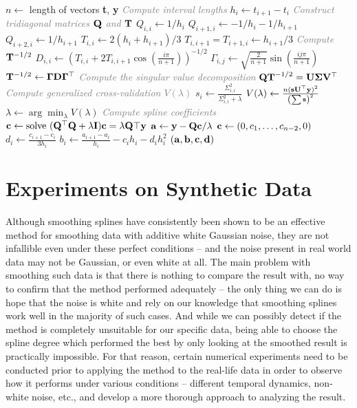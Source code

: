 \documentclass[11pt,leqno]{book}
\theoremstyle{definition}
\theoremstyle{plain}
\theoremstyle{definition}
\begin{document}
{\begin{algorithm}[H]
\begin{algorithmic}[1]
\State $n \gets$ length of vectors \textbf{t}, \textbf{y}
\State \textcolor{gray}{\textit{Compute interval lengths}}
    \State ${h}_i \gets {t}_{i+1} - {t}_{i}$
\EndFor
\State \textcolor{gray}{\textit{Construct tridiagonal matrices $\vb{Q}$ and $\vb{T}$}}
    \State ${Q}_{i,i}\gets{1}/{h_i}$
    \State ${Q}_{i+1,i}\gets-1/{h}_i-1/{h}_{i+1}$
    \State ${Q}_{i+2,i}\gets{1}/{{h}_{i+1}}$
    \State ${T}_{i,i}\gets{2({h}_i+{h}_{i+1})}/{3}$
    \State ${T}_{i,i+1}={T}_{i+1,i}\gets{{h}_{i+1}}/{3}$
\EndFor
\State \textcolor{gray}{\textit{Compute $\vb{T}^{-1/2}$}}
    \State ${D}_{i,i} \gets \left({T}_{i,i}+2{T}_{i,i+1}\cos(\frac{i\pi}{n+1})\right)^{-1/2}$
        \State ${{\Gamma}}_{i,j}\gets  \sqrt{\frac{2}{n+1}}\sin(\frac{ij\pi}{n+1})$
    \EndFor
\EndFor
\State $\vb{T}^{-1/2}\gets \vb{\Gamma}\vb{D}\vb{\Gamma}^\top$
\State \textcolor{gray}{\textit{Compute the singular value decomposition}}
\State $\vb{QT}^{-1/2}=\vb{U}\vb{\Sigma}\vb{V}^\top$
\State \textcolor{gray}{\textit{Compute generalized cross-validation $V(\lambda)$}}
    \State ${{s}_i} \gets \frac{{{\Sigma}^2_{i,i}}}{{{\Sigma}^2_{i,i}}+\lambda }$
\EndFor
\State $V(\lambda)\gets \frac{n(\vb{s}\vb{U}^\top \vb{y})^2}{\left(\sum\vb{s}\right)^2}$
\State $\lambda \gets \arg\min_{\lambda} V(\lambda)$
\State \textcolor{gray}{\textit{Compute spline coefficients}}
\State $\vb{c}\gets \text{solve } (\vb{Q}^\top\vb{Q}+\lambda\vb{I})\vb{c}=\lambda\vb{Q}\top\vb{y}$
\State $\vb{a}\gets\vb{y}-\vb{Qc}/\lambda$
\State $\vb{c}\gets(0,c_1,\dots,c_{n-2},0)$
\State ${d}_i\gets\frac{{c}_{i+1}-{c}_i}{3{h}_i}$
\State  ${b}_i \gets\frac{{a}_{i+1}-{a}_i}{{h}_i} -{c}_i {h}_i -{d}_i {h}_i^2$
\EndFor
\State \Return $(\vb{a},\vb{b},\vb{c},\vb{d})$
\EndProcedure
\end{algorithmic}
\end{algorithm}
\chapter{Experiments on Synthetic Data}
Although smoothing splines have consistently been shown to be an effective method for smoothing data with additive white Gaussian noise, they are not infallible even under these perfect conditions -- and the noise present in real world data may not be Gaussian, or even white at all. The main problem with smoothing such data is that there is nothing to compare the result with, no way to confirm that the method performed adequately -- the only thing we can do is hope that the noise is white and rely on our knowledge that smoothing splines work well in the majority of such cases. And while we can possibly detect if the method is completely unsuitable for our specific data, being able to choose the spline degree which performed the best by only looking at the smoothed result is practically impossible. For that reason, certain numerical experiments need to be conducted prior to applying the method to the real-life data in order to observe how it performs under various conditions -- different temporal dynamics, non-white noise, etc., and develop a more thorough approach to analyzing the result.
}
\end{document}
